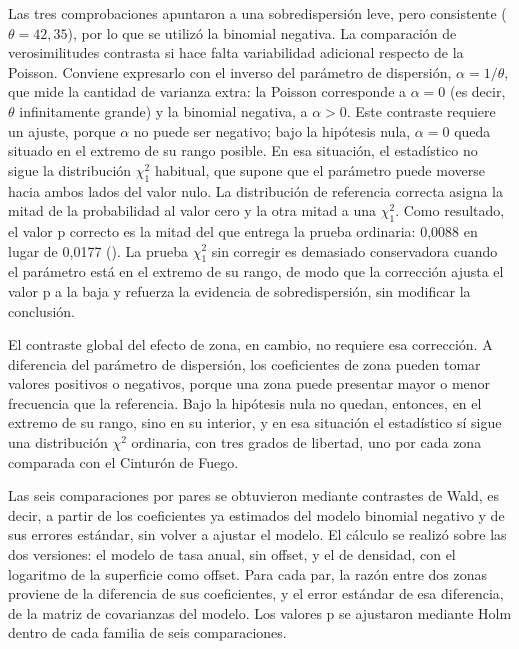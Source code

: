 \documentclass[
  spanish,
  letterpaper,
  DIV=11,
  numbers=noendperiod]{scrartcl}
\begin{document}
Las tres comprobaciones apuntaron a una sobredispersión leve, pero
consistente (\(\theta=42{,}35\)), por lo que se utilizó la binomial
negativa. La comparación de verosimilitudes contrasta si hace falta
variabilidad adicional respecto de la Poisson. Conviene expresarlo con
el inverso del parámetro de dispersión, \(\alpha=1/\theta\), que mide la
cantidad de varianza extra: la Poisson corresponde a \(\alpha=0\) (es
decir, \(\theta\) infinitamente grande) y la binomial negativa, a
\(\alpha>0\). Este contraste requiere un ajuste, porque \(\alpha\) no
puede ser negativo; bajo la hipótesis nula, \(\alpha=0\) queda situado
en el extremo de su rango posible. En esa situación, el estadístico no
sigue la distribución \(\chi^2_1\) habitual, que supone que el parámetro
puede moverse hacia ambos lados del valor nulo. La distribución de
referencia correcta asigna la mitad de la probabilidad al valor cero y
la otra mitad a una \(\chi^2_1\). Como resultado, el valor p correcto es
la mitad del que entrega la prueba ordinaria: 0,0088 en lugar de 0,0177
(). La prueba
\(\chi^2_1\) sin corregir es demasiado conservadora cuando el parámetro
está en el extremo de su rango, de modo que la corrección ajusta el
valor p a la baja y refuerza la evidencia de sobredispersión, sin
modificar la conclusión.

El contraste global del efecto de zona, en cambio, no requiere esa
corrección. A diferencia del parámetro de dispersión, los coeficientes
de zona pueden tomar valores positivos o negativos, porque una zona
puede presentar mayor o menor frecuencia que la referencia. Bajo la
hipótesis nula no quedan, entonces, en el extremo de su rango, sino en
su interior, y en esa situación el estadístico sí sigue una distribución
\(\chi^2\) ordinaria, con tres grados de libertad, uno por cada zona
comparada con el Cinturón de Fuego.

Las seis comparaciones por pares se obtuvieron mediante contrastes de
Wald, es decir, a partir de los coeficientes ya estimados del modelo
binomial negativo y de sus errores estándar, sin volver a ajustar el
modelo. El cálculo se realizó sobre las dos versiones: el modelo de tasa
anual, sin offset, y el de densidad, con el logaritmo de la superficie
como offset. Para cada par, la razón entre dos zonas proviene de la
diferencia de sus coeficientes, y el error estándar de esa diferencia,
de la matriz de covarianzas del modelo. Los valores p se ajustaron
mediante Holm dentro de cada familia de seis comparaciones.
\end{document}
